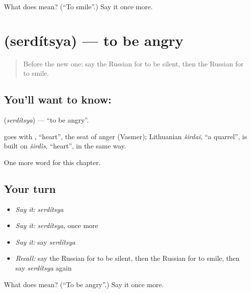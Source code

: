 \begin{tcolorbox}[breakable,colback=teal!4,colframe=teal!35!black,title={Before you move on}]
What does  mean? (\textquotedblleft{}To smile\textquotedblright{}.) Say it once more.
\end{tcolorbox}
\section[\texorpdfstring{\ru{сердиться} (serdítsya)}{сердиться (serdítsya)}]{ (serdítsya) — to be angry}

\label{lesson:RU-C235-serditsya}



\begin{quote}
Before the new one: say the Russian for to be silent, then the Russian for to smile.
\end{quote}

\subsection*{You'll want to know: }
\textbf{} (\emph{serdítsya}) — \textquotedblleft{}to be angry\textquotedblright{}.

\begin{cousinweb}
\textbf{} goes with \emph{}, \textquotedblleft{}heart\textquotedblright{}, the seat of anger (Vasmer); Lithuanian \emph{širdaĩ}, \textquotedblleft{}a quarrel\textquotedblright{}, is built on \emph{širdìs}, \textquotedblleft{}heart\textquotedblright{}, in the same way.
\end{cousinweb}

\begin{grammarlens}[title={What you've built}]
One more word for this chapter.
\end{grammarlens}

\subsection*{Your turn}
\begin{itemize}
\raggedright
  \item \emph{Say it:} \emph{serdítsya}
  \item \emph{Say it:} \emph{serdítsya}, once more
  \item \emph{Say it:} say \emph{serdítsya}
  \item \emph{Recall:} say the Russian for to be silent, then the Russian for to smile, then say \emph{serdítsya} again
\end{itemize}

\begin{tcolorbox}[breakable,colback=teal!4,colframe=teal!35!black,title={Before you move on}]
What does  mean? (\textquotedblleft{}To be angry\textquotedblright{}.) Say it once more.
\end{tcolorbox}
